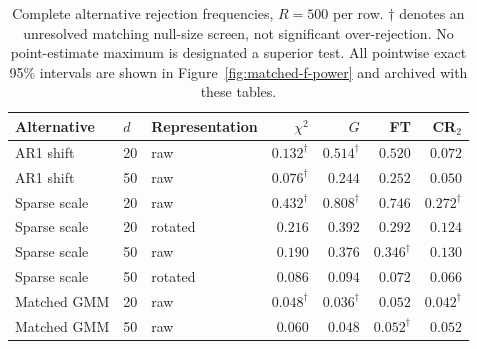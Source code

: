 \begin{table}[t]
\caption{Complete alternative rejection frequencies, $R=500$ per row. $\dagger$ denotes an unresolved matching null-size screen, not significant over-rejection. No point-estimate maximum is designated a superior test. All pointwise exact 95\% intervals are shown in Figure~\ref{fig:matched-f-power} and archived with these tables.}
\label{tab:matched-f-power}
\centering\small
\setlength{\tabcolsep}{8pt}\renewcommand{\arraystretch}{1.2}
\begin{tabular}{lllrrrr}
\toprule
Alternative & $d$ & Representation & $\chi^2$ & $G$ & FT & CR$_2$ \\
\midrule
AR1 shift & 20 & raw & $0.132^{\dagger}$ & $0.514^{\dagger}$ & $0.520$ & $0.072$ \\
AR1 shift & 50 & raw & $0.076^{\dagger}$ & $0.244$ & $0.252$ & $0.050$ \\
Sparse scale & 20 & raw & $0.432^{\dagger}$ & $0.808^{\dagger}$ & $0.746$ & $0.272^{\dagger}$ \\
Sparse scale & 20 & rotated & $0.216$ & $0.392$ & $0.292$ & $0.124$ \\
Sparse scale & 50 & raw & $0.190$ & $0.376$ & $0.346^{\dagger}$ & $0.130$ \\
Sparse scale & 50 & rotated & $0.086$ & $0.094$ & $0.072$ & $0.066$ \\
Matched GMM & 20 & raw & $0.048^{\dagger}$ & $0.036^{\dagger}$ & $0.052$ & $0.042^{\dagger}$ \\
Matched GMM & 50 & raw & $0.060$ & $0.048$ & $0.052^{\dagger}$ & $0.052$ \\
\bottomrule
\end{tabular}
\end{table}

